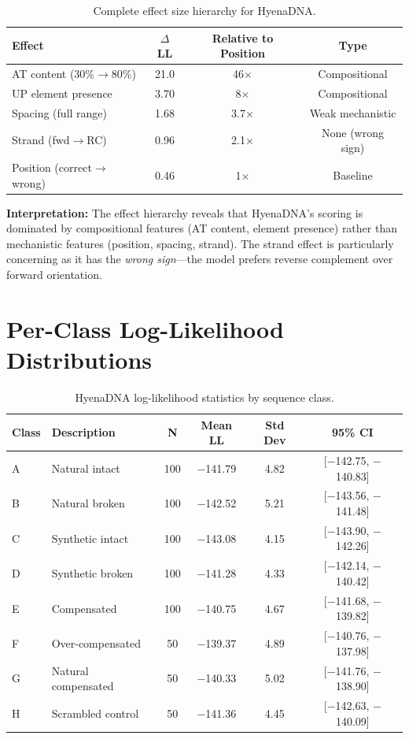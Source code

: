 \documentclass{article}
\begin{document}
\begin{table}[H]
\caption{Complete effect size hierarchy for HyenaDNA.}
\label{tab:effect_sizes}
\begin{center}
\small
\begin{tabular}{lccc}
\toprule
Effect & $\Delta$LL & Relative to Position & Type \\
\midrule
AT content (30\%$\rightarrow$80\%) & 21.0 & 46$\times$ & Compositional \\
UP element presence & 3.70 & 8$\times$ & Compositional \\
Spacing (full range) & 1.68 & 3.7$\times$ & Weak mechanistic \\
Strand (fwd$\rightarrow$RC) & 0.96 & 2.1$\times$ & None (wrong sign) \\
Position (correct$\rightarrow$wrong) & 0.46 & 1$\times$ & Baseline \\
\bottomrule
\end{tabular}
\end{center}
\end{table}

\textbf{Interpretation:} The effect hierarchy reveals that HyenaDNA's scoring is dominated by compositional features (AT content, element presence) rather than mechanistic features (position, spacing, strand). The strand effect is particularly concerning as it has the \textit{wrong sign}---the model prefers reverse complement over forward orientation.

\section{Per-Class Log-Likelihood Distributions}
\label{app:distributions}

\begin{table}[H]
\caption{HyenaDNA log-likelihood statistics by sequence class.}
\label{tab:class_ll}
\begin{center}
\small
\begin{tabular}{llcccc}
\toprule
Class & Description & N & Mean LL & Std Dev & 95\% CI \\
\midrule
A & Natural intact & 100 & $-$141.79 & 4.82 & [$-$142.75, $-$140.83] \\
B & Natural broken & 100 & $-$142.52 & 5.21 & [$-$143.56, $-$141.48] \\
C & Synthetic intact & 100 & $-$143.08 & 4.15 & [$-$143.90, $-$142.26] \\
D & Synthetic broken & 100 & $-$141.28 & 4.33 & [$-$142.14, $-$140.42] \\
E & Compensated & 100 & $-$140.75 & 4.67 & [$-$141.68, $-$139.82] \\
F & Over-compensated & 50 & $-$139.37 & 4.89 & [$-$140.76, $-$137.98] \\
G & Natural compensated & 50 & $-$140.33 & 5.02 & [$-$141.76, $-$138.90] \\
H & Scrambled control & 50 & $-$141.36 & 4.45 & [$-$142.63, $-$140.09] \\
\bottomrule
\end{tabular}
\end{center}
\end{table}
\end{document}
